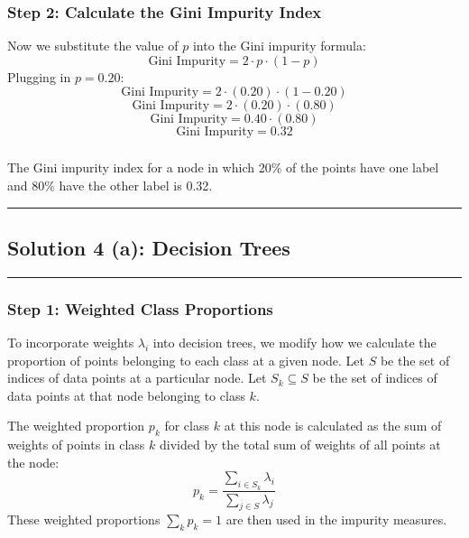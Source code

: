 \documentclass{article}
\begin{document}
\subsubsection*{Step 2: Calculate the Gini Impurity Index}
\parbox{\textwidth}{
Now we substitute the value of $p$ into the Gini impurity formula:
$$ \text{Gini Impurity} = 2 \cdot p \cdot (1-p) $$
Plugging in $p = 0.20$:
$$ \text{Gini Impurity} = 2 \cdot (0.20) \cdot (1 - 0.20) $$
$$ \text{Gini Impurity} = 2 \cdot (0.20) \cdot (0.80) $$
$$ \text{Gini Impurity} = 0.40 \cdot (0.80) $$
$$ \text{Gini Impurity} = 0.32 $$
}

\subsubsection*{}
\parbox{\textwidth}{
The Gini impurity index for a node in which 20\% of the points have one label and 80\% have the other label is 0.32.
}

\noindent\rule{\textwidth}{0.4pt}

\newpage

\subsection*{Solution 4 (a): Decision Trees}
\noindent\rule{\textwidth}{0.4pt}

\subsubsection*{Step 1: Weighted Class Proportions}
\parbox{\textwidth}{
To incorporate weights $\lambda_i$ into decision trees, we modify how we calculate the proportion of points belonging to each class at a given node. Let $S$ be the set of indices of data points at a particular node. Let $S_k \subseteq S$ be the set of indices of data points at that node belonging to class $k$.

The weighted proportion $p_k$ for class $k$ at this node is calculated as the sum of weights of points in class $k$ divided by the total sum of weights of all points at the node:
$$ p_k = \frac{\sum_{i \in S_k} \lambda_i}{\sum_{j \in S} \lambda_j} $$
These weighted proportions $\sum_{k} p_k = 1$ are then used in the impurity measures.
}
\end{document}
